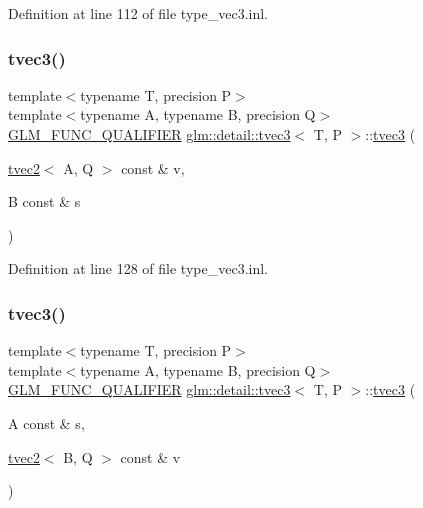 Definition at line 112 of file type\+\_\+vec3.\+inl.

\mbox{\label{structglm_1_1detail_1_1tvec3_a3ccc7d56bdf43a20d16ea3368e068303}} 
\subsubsection{\texorpdfstring{tvec3()}{tvec3()}\hspace{0.1cm}{\footnotesize\ttfamily [14/17]}}
{\footnotesize\ttfamily template$<$typename T, precision P$>$ \\
template$<$typename A, typename B, precision Q$>$ \\
\hyperlink{setup_8hpp_a33fdea6f91c5f834105f7415e2a64407}{G\+L\+M\+\_\+\+F\+U\+N\+C\+\_\+\+Q\+U\+A\+L\+I\+F\+I\+ER} \hyperlink{structglm_1_1detail_1_1tvec3}{glm\+::detail\+::tvec3}$<$ T, P $>$\+::\hyperlink{structglm_1_1detail_1_1tvec3}{tvec3} (\begin{DoxyParamCaption}\item[{\hyperlink{structglm_1_1detail_1_1tvec2}{tvec2}$<$ A, Q $>$ const \&}]{v,  }\item[{B const \&}]{s }\end{DoxyParamCaption})}



Definition at line 128 of file type\+\_\+vec3.\+inl.

\mbox{\label{structglm_1_1detail_1_1tvec3_a56aa783c0a641d602097aacf8e87f63f}} 
\subsubsection{\texorpdfstring{tvec3()}{tvec3()}\hspace{0.1cm}{\footnotesize\ttfamily [15/17]}}
{\footnotesize\ttfamily template$<$typename T, precision P$>$ \\
template$<$typename A, typename B, precision Q$>$ \\
\hyperlink{setup_8hpp_a33fdea6f91c5f834105f7415e2a64407}{G\+L\+M\+\_\+\+F\+U\+N\+C\+\_\+\+Q\+U\+A\+L\+I\+F\+I\+ER} \hyperlink{structglm_1_1detail_1_1tvec3}{glm\+::detail\+::tvec3}$<$ T, P $>$\+::\hyperlink{structglm_1_1detail_1_1tvec3}{tvec3} (\begin{DoxyParamCaption}\item[{A const \&}]{s,  }\item[{\hyperlink{structglm_1_1detail_1_1tvec2}{tvec2}$<$ B, Q $>$ const \&}]{v }\end{DoxyParamCaption})}



